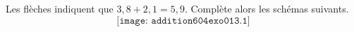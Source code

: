 Les flèches indiquent que $3,8+2,1=5,9$. Complète alors les schémas suivants.
\[\texttt{[image: addition604exo013.1]}\]